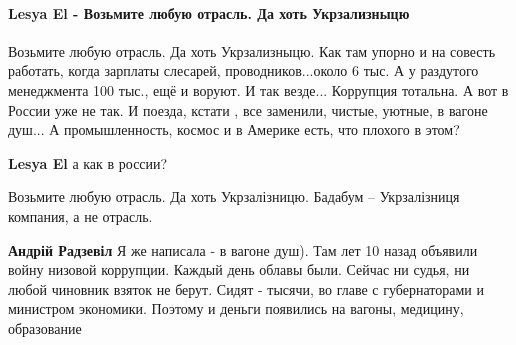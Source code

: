 
 
 
 
 
\paragraph{Lesya El - Возьмите любую отрасль. Да хоть Укрзализныцю}

\begin{itemize}
 
Возьмите любую отрасль. Да хоть Укрзализныцю. Как там упорно и на совесть
работать, когда зарплаты слесарей, проводников...около 6 тыс. А у раздутого
менеджмента 100 тыс., ещё и воруют. И так везде... Коррупция тотальна. А вот в
России уже не так. И поезда, кстати , все заменили, чистые, уютные, в вагоне
душ... А промышленность, космос и в Америке есть, что плохого в этом?

\begin{itemize}
 
\textbf{Lesya El} а как в россии?

 
Возьмите любую отрасль.
Да хоть Укрзалізницю.
Бадабум – Укрзалізниця компания, а не отрасль.

 
\textbf{Андрій Радзевіл} Я же написала - в вагоне душ). Там лет 10 назад объявили войну низовой коррупции. Каждый день облавы были. Сейчас ни судья, ни любой чиновник взяток не берут. Сидят - тысячи, во главе с губернаторами и министром экономики. Поэтому и деньги появились на вагоны, медицину, образование


\end{itemize}
\end{itemize}
